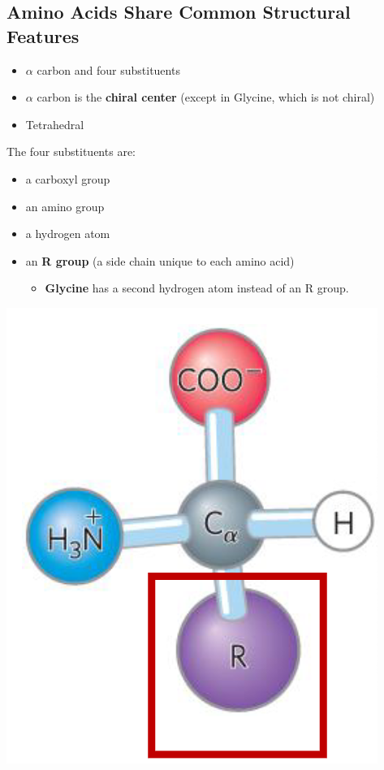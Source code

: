 \documentclass[10pt]{article}
\begin{document}
\subsection*{Amino Acids Share Common Structural Features}
\begin{itemize}
    \item $\alpha$ carbon and four substituents
    \item $\alpha$ carbon is the \textbf{chiral center} (except in Glycine, which is not chiral)
    \item Tetrahedral
\end{itemize}
The four substituents are:
\begin{itemize}
    \item a carboxyl group
    \item an amino group
    \item a hydrogen atom
    \item an \textbf{R group} (a side chain unique to each amino acid)
    \begin{itemize}
        \item \textbf{Glycine} has a second hydrogen atom instead of an R group.
    \end{itemize}
\end{itemize}   
\begin{center}
    \includegraphics[scale=0.5]{L1_5.png}
\end{center}
\end{document}
